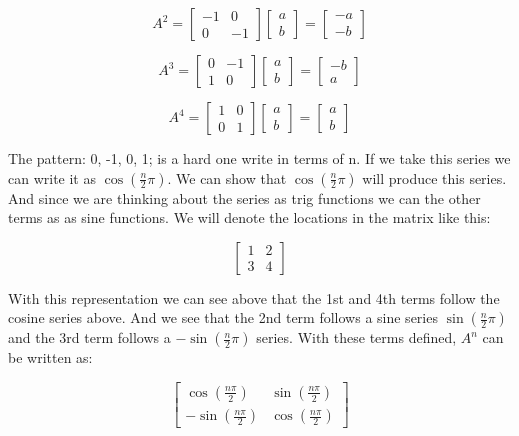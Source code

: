 \documentclass[12pt]{article}
\begin{document}
\[
A^{2} =
\begin{bmatrix}
-1 & 0\\
0 & -1
\end{bmatrix}
\begin{bmatrix}
a\\
b
\end{bmatrix}
=
\begin{bmatrix}
-a\\
-b
\end{bmatrix}
\]

\[
A^{3} =
\begin{bmatrix}
0 & -1\\
1 & 0
\end{bmatrix}
\begin{bmatrix}
a\\
b
\end{bmatrix}
=
\begin{bmatrix}
-b\\
a
\end{bmatrix}
\]

\[
A^{4} = 
\begin{bmatrix}
1 & 0\\
0 & 1
\end{bmatrix}
\begin{bmatrix}
a\\
b
\end{bmatrix}
=
\begin{bmatrix}
a\\
b
\end{bmatrix}
\]

The pattern: 0, -1, 0, 1; is a hard one write in terms of n. If we take this series we can write it as $\cos (\frac{n}{2}\pi)$. We can show that $\cos (\frac{n}{2}\pi)$ will produce this series. And since we are thinking about the series as trig functions we can the other terms as as sine functions. We will denote the locations in the matrix like this:

\[
\begin{bmatrix}
1 & 2\\
3 & 4
\end{bmatrix}
\] 

With this representation we can see above that the 1st and 4th terms follow the cosine series above. And we see that the 2nd term follows a sine series $\sin (\frac{n}{2}\pi)$ and the 3rd term follows a $- \sin (\frac{n}{2}\pi)$ series. With these terms defined, $A^{n}$ can be written as:

\[
\begin{bmatrix}
\cos (\frac{n \pi}{2}) & \sin (\frac{n \pi}{2})\\
-\sin (\frac{n \pi}{2}) & \cos (\frac{n \pi}{2})
\end{bmatrix}
\]
\end{document}
